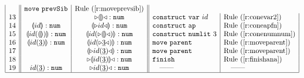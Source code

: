 \documentclass{llncs}
\begin{document}
\begin{figure}[t]
\[\begin{array}{|c||c|c||l|l|}
&
\mathtt{move}~\mathtt{prevSib}{} & \textrm{Rule~(\ref{r:moveprevsib})}
\\
13 &
 &
{\triangleright}{\llparenthesis\rrparenthesis}{\triangleleft} : \texttt{num}{}
&
\mathtt{construct}~ \mathtt{var}~id & \textrm{Rule~(\ref{r:conevar2})}
\\
14 &
\llparenthesis\textrm{$id$}\rrparenthesis : \texttt{num}{} &
\llparenthesis{\triangleright}{{\textrm{$id$}}}{\triangleleft}\rrparenthesis : \texttt{num}{}
&
\mathtt{construct}~\mathtt{ap}{} & \textrm{Rule~(\ref{r:coneapfn})}
\\
15 &
\llparenthesis{{\textrm{$id$}}}({\llparenthesis\rrparenthesis})\rrparenthesis : \texttt{num}{}
&
\llparenthesis{{\textrm{$id$}}}({\triangleright}{\llparenthesis\rrparenthesis}{\triangleleft})\rrparenthesis : \texttt{num}{}
&
\mathtt{construct}~\mathtt{numlit}~3 &  \textrm{Rule~(\ref{r:conenumnum})}
\\
16 &
\llparenthesis{{\textrm{$id$}}}({\underline{3}})\rrparenthesis : \texttt{num}{}
&
\llparenthesis{{\textrm{$id$}}}({\triangleright}{\underline{3}}{\triangleleft})\rrparenthesis : \texttt{num}{}
&
\mathtt{move}~\mathtt{parent}{} &  \textrm{Rule~(\ref{r:moveparent})}
\\
17 &
&
\llparenthesis{\triangleright}{{{\textrm{$id$}}}({\underline{3}})}{\triangleleft}\rrparenthesis : \texttt{num}{}
&
\mathtt{move}~\mathtt{parent}{} &  \textrm{Rule~(\ref{r:moveparent})}
\\
18 &
&
{\triangleright}{\llparenthesis{{{\textrm{$id$}}}({\underline{3}})}\rrparenthesis}{\triangleleft} : \texttt{num}{}
&
\mathtt{finish} &  \textrm{Rule~(\ref{r:finishana})}
\\
19 &
{{{\textrm{$id$}}}({\underline{3}})} : \texttt{num}{}
&
{\triangleright}{{{{{\textrm{$id$}}}({\underline{3}})}}}{\triangleleft} : \texttt{num}{}
&
\quad\textrm{---{}---} & \quad\textrm{---{}---}
\\
\hline


\end{array}\]
\end{figure}
\end{document}
